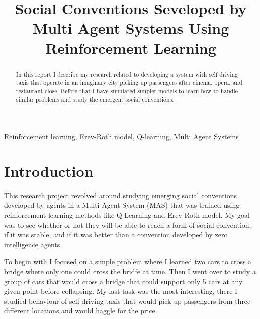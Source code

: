 \documentclass[conference]{IEEEtran}
\begin{document}
  
  \title{Social Conventions Seveloped by Multi Agent Systems Using Reinforcement Learning}
  
  \author{
  }

\maketitle

\begin{abstract}
  In this report I describe my research related to developing a system with self driving taxis that operate in an imaginary city picking up passengers after cinema, opera, and restaurant close. Before that I have simulated simpler models to learn how to handle similar problems and study the emergent social conventions.
\end{abstract}

\begin{IEEEkeywords}
  Reinforcement learning, Erev-Roth model, Q-learning, Multi Agent Systems
\end{IEEEkeywords}

\section{Introduction}
This research project revolved around studying emerging social conventions developed by agents in a Multi Agent System (MAS) that was trained using reinforcement learning methods like Q-Learning and Erev-Roth model. My goal was to see whether or not they will be able to reach a form of social convention, if it was stable, and if it was better than a convention developed by zero intelligence agents.

To begin with I focused on a simple problem where I learned two cars to cross a bridge where only one could cross the bridfe at time. Then I went over to study a group of cars that would cross a bridge that could support only 5 cars at any given point before collapsing. My last task was the most interesting, there I studied behaviour of self driving taxis that would pick up passengers from three different locations and would haggle for the price.
\end{document}

